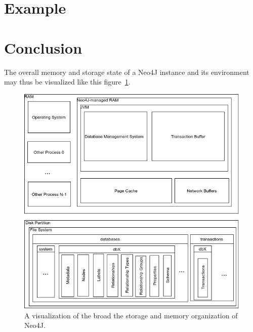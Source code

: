 \documentclass[a4paper,10pt]{article}
\begin{document}
\section{Example}

\section{Conclusion}
The overall memory and storage state of a Neo4J instance and its environment may thus be visualized like this figure~\ref{N4J_memory_view}.

\begin{figure}[htp]\label{N4J_memory_view}
 \begin{center}
  \includegraphics[keepaspectratio,width=\textwidth]{img/N4J_memory_view.png}
 \end{center}
 \caption{A visualization of the broad the storage and memory organization of Neo4J.} %
\end{figure}
\end{document}

